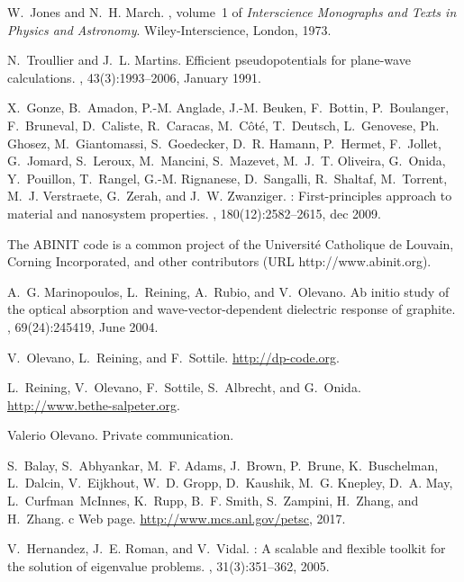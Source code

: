 \documentclass[aps,prb,10pt,showpacs,superscriptaddress,twocolumn,notitlepage]{revtex4-1}
\begin{document}
\begin{thebibliography}{10}
W.~Jones and N.~H. March.
, volume~1 of {\em Interscience {Monographs} and
  {Texts} in {Physics} and {Astronomy}}.
\newblock Wiley-Interscience, London, 1973.

N.~Troullier and J.~L. Martins.
\newblock Efficient pseudopotentials for plane-wave calculations.
, 43(3):1993--2006, January 1991.

X.~Gonze, B.~Amadon, P.-M. Anglade, J.-M. Beuken, F.~Bottin, P.~Boulanger,
  F.~Bruneval, D.~Caliste, R.~Caracas, M.~C{\^{o}}t{\'{e}}, T.~Deutsch,
  L.~Genovese, Ph. Ghosez, M.~Giantomassi, S.~Goedecker, D.~R. Hamann,
  P.~Hermet, F.~Jollet, G.~Jomard, S.~Leroux, M.~Mancini, S.~Mazevet, M.~J.~T.
  Oliveira, G.~Onida, Y.~Pouillon, T.~Rangel, G.-M. Rignanese, D.~Sangalli,
  R.~Shaltaf, M.~Torrent, M.~J. Verstraete, G.~Zerah, and J.~W. Zwanziger.
: First-principles approach to material and nanosystem
  properties.
, 180(12):2582--2615, dec 2009.

The ABINIT code is a common project of the Universit{\'e} Catholique de
  Louvain, Corning Incorporated, and other contributors (URL
  http://www.abinit.org).

A.~G. Marinopoulos, L.~Reining, A.~Rubio, and V.~Olevano.
\newblock Ab initio study of the optical absorption and wave-vector-dependent
  dielectric response of graphite.
, 69(24):245419, June 2004.

V.~Olevano, L.~Reining, and F.~Sottile.
\newblock \url{http://dp-code.org}.

L.~Reining, V.~Olevano, F.~Sottile, S.~Albrecht, and G.~Onida.
\newblock \url{http://www.bethe-salpeter.org}.

Valerio Olevano.
\newblock Private communication.

S.~Balay, S.~Abhyankar, M.~F. Adams, J.~Brown, P.~Brune, K.~Buschelman,
  L.~Dalcin, V.~Eijkhout, W.~D. Gropp, D.~Kaushik, M.~G. Knepley, D.~A. May,
  L.~Curfman~McInnes, K.~Rupp, B.~F. Smith, S.~Zampini, H.~Zhang, and H.~Zhang.
c {W}eb page.
\newblock \url{http://www.mcs.anl.gov/petsc}, 2017.

V.~Hernandez, J.~E. Roman, and V.~Vidal.
: A scalable and flexible toolkit for the solution of
  eigenvalue problems.
, 31(3):351--362, 2005.


\end{thebibliography}
\end{document}
